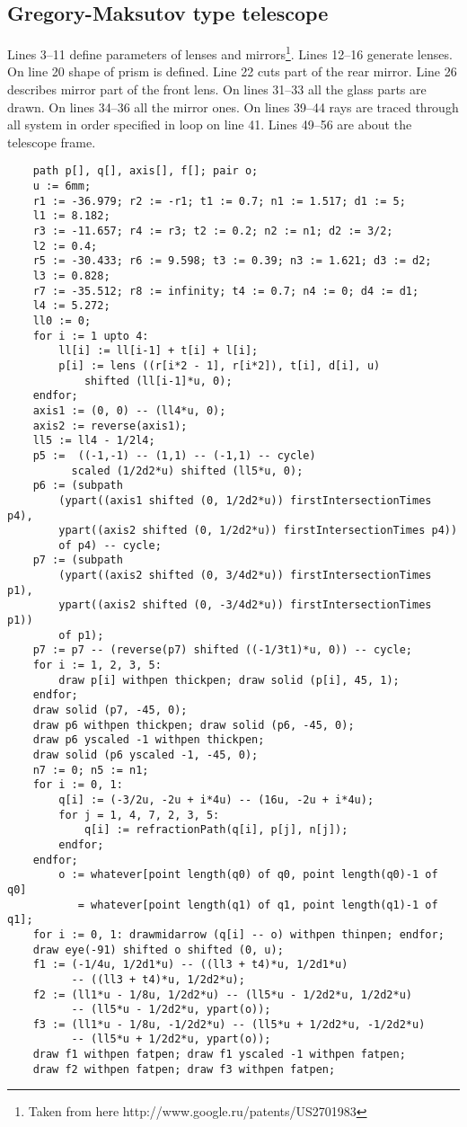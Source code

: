 \documentclass{ltxdoc}
\begin{document}
\subsection{Gregory-Maksutov type telescope}
Lines 3--11 define parameters of lenses and mirrors\footnote{Taken from here http://www.google.ru/patents/US2701983}. Lines 12--16 generate lenses. On line 20 shape of prism is defined. Line 22 cuts part of the rear mirror. Line 26 describes mirror part of the front lens. On lines 31--33 all the glass parts are drawn. On lines 34--36 all the mirror ones. On lines 39--44 rays are traced through all system in order specified in loop on line 41. Lines 49--56 are about the telescope frame.
\begin{lstlisting}
    path p[], q[], axis[], f[]; pair o;
    u := 6mm;
    r1 := -36.979; r2 := -r1; t1 := 0.7; n1 := 1.517; d1 := 5;
    l1 := 8.182;
    r3 := -11.657; r4 := r3; t2 := 0.2; n2 := n1; d2 := 3/2;
    l2 := 0.4;
    r5 := -30.433; r6 := 9.598; t3 := 0.39; n3 := 1.621; d3 := d2;
    l3 := 0.828;
    r7 := -35.512; r8 := infinity; t4 := 0.7; n4 := 0; d4 := d1;
    l4 := 5.272;
    ll0 := 0;
    for i := 1 upto 4:
    	ll[i] := ll[i-1] + t[i] + l[i];
    	p[i] := lens ((r[i*2 - 1], r[i*2]), t[i], d[i], u) 
	        shifted (ll[i-1]*u, 0);
    endfor;
    axis1 := (0, 0) -- (ll4*u, 0);
    axis2 := reverse(axis1);
    ll5 := ll4 - 1/2l4;
    p5 :=  ((-1,-1) -- (1,1) -- (-1,1) -- cycle)
          scaled (1/2d2*u) shifted (ll5*u, 0);
    p6 := (subpath 
        (ypart((axis1 shifted (0, 1/2d2*u)) firstIntersectionTimes p4), 
        ypart((axis2 shifted (0, 1/2d2*u)) firstIntersectionTimes p4))
        of p4) -- cycle;
    p7 := (subpath 
        (ypart((axis2 shifted (0, 3/4d2*u)) firstIntersectionTimes p1), 
        ypart((axis2 shifted (0, -3/4d2*u)) firstIntersectionTimes p1))
        of p1);
    p7 := p7 -- (reverse(p7) shifted ((-1/3t1)*u, 0)) -- cycle;
    for i := 1, 2, 3, 5: 
        draw p[i] withpen thickpen; draw solid (p[i], 45, 1); 
    endfor;
    draw solid (p7, -45, 0);
    draw p6 withpen thickpen; draw solid (p6, -45, 0);
    draw p6 yscaled -1 withpen thickpen;
    draw solid (p6 yscaled -1, -45, 0);
    n7 := 0; n5 := n1;
    for i := 0, 1:
        q[i] := (-3/2u, -2u + i*4u) -- (16u, -2u + i*4u);
        for j = 1, 4, 7, 2, 3, 5: 
            q[i] := refractionPath(q[i], p[j], n[j]);
        endfor;
    endfor;
        o := whatever[point length(q0) of q0, point length(q0)-1 of q0] 
           = whatever[point length(q1) of q1, point length(q1)-1 of q1];
    for i := 0, 1: drawmidarrow (q[i] -- o) withpen thinpen; endfor;
    draw eye(-91) shifted o shifted (0, u);
    f1 := (-1/4u, 1/2d1*u) -- ((ll3 + t4)*u, 1/2d1*u)
          -- ((ll3 + t4)*u, 1/2d2*u);
    f2 := (ll1*u - 1/8u, 1/2d2*u) -- (ll5*u - 1/2d2*u, 1/2d2*u)
          -- (ll5*u - 1/2d2*u, ypart(o));
    f3 := (ll1*u - 1/8u, -1/2d2*u) -- (ll5*u + 1/2d2*u, -1/2d2*u)
          -- (ll5*u + 1/2d2*u, ypart(o));
    draw f1 withpen fatpen; draw f1 yscaled -1 withpen fatpen;
    draw f2 withpen fatpen; draw f3 withpen fatpen;
\end{lstlisting}
\end{document}
